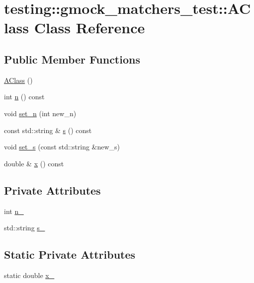 \hypertarget{classtesting_1_1gmock__matchers__test_1_1_a_class}{}\section{testing\+::gmock\+\_\+matchers\+\_\+test\+::A\+Class Class Reference}
\label{classtesting_1_1gmock__matchers__test_1_1_a_class}
\subsection*{Public Member Functions}
\begin{DoxyCompactItemize}
\item 
\mbox{\hyperlink{classtesting_1_1gmock__matchers__test_1_1_a_class_ac43d717a80bb6fad8c77dc36f963ca88}{A\+Class}} ()
\item 
int \mbox{\hyperlink{classtesting_1_1gmock__matchers__test_1_1_a_class_add84ab9ef4a6bbe78719a9528bf6fb90}{n}} () const
\item 
void \mbox{\hyperlink{classtesting_1_1gmock__matchers__test_1_1_a_class_a3181466cec6faa5ab3c6bc5c4dbf67b2}{set\+\_\+n}} (int new\+\_\+n)
\item 
const std\+::string \& \mbox{\hyperlink{classtesting_1_1gmock__matchers__test_1_1_a_class_a1645862d2061ccf04b67761314c7bb97}{s}} () const
\item 
void \mbox{\hyperlink{classtesting_1_1gmock__matchers__test_1_1_a_class_a9e2ea4f630928618137cfaadb6298fcf}{set\+\_\+s}} (const std\+::string \&new\+\_\+s)
\item 
double \& \mbox{\hyperlink{classtesting_1_1gmock__matchers__test_1_1_a_class_ade61d438cb535d71d0dcc17a1d5bd7cd}{x}} () const
\end{DoxyCompactItemize}
\subsection*{Private Attributes}
\begin{DoxyCompactItemize}
\item 
int \mbox{\hyperlink{classtesting_1_1gmock__matchers__test_1_1_a_class_a35f74ba216b29f75de1d0f1cefaaa848}{n\+\_\+}}
\item 
std\+::string \mbox{\hyperlink{classtesting_1_1gmock__matchers__test_1_1_a_class_a3d875b30248908de76e8b67687a06378}{s\+\_\+}}
\end{DoxyCompactItemize}
\subsection*{Static Private Attributes}
\begin{DoxyCompactItemize}
\item 
static double \mbox{\hyperlink{classtesting_1_1gmock__matchers__test_1_1_a_class_a30c167756c720e1e793583006a9b3115}{x\+\_\+}}
\end{DoxyCompactItemize}


